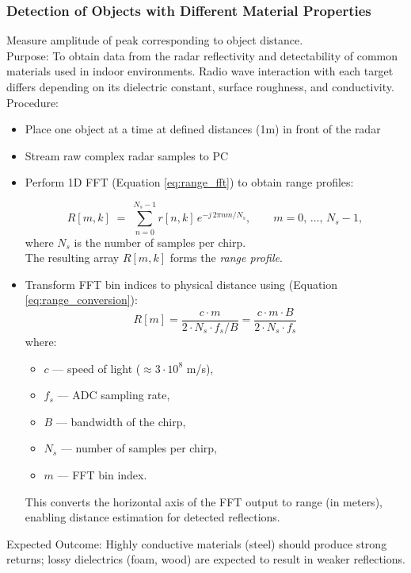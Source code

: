 \subsubsection{Detection of Objects with Different Material Properties} 
\noindent
Measure amplitude of peak corresponding to object distance. 
\\
Purpose:
To obtain data from the radar reflectivity and detectability of common materials used in indoor environments. Radio wave interaction with each target differs depending on its dielectric constant, surface roughness, and conductivity.
Procedure:
\begin{itemize}
\item     Place one object at a time at defined distances (1m) in front of the radar
\item     Stream raw complex radar samples to PC
\item     Perform 1D FFT (Equation \ref{eq:range_fft}) to obtain range profiles:

\begin{equation}
    R[m,k] \;=\;
        \sum_{n=0}^{N_s-1} r[n,k]\,
        e^{-j\,2\pi n m / N_s},
    \qquad
    m = 0,\,\dots,\,N_s-1,
    \label{eq:range_fft}
\end{equation}
where $N_s$ is the number of samples per chirp.  \\
The resulting array $R[m,k]$ forms the \emph{range profile}.
\item Transform FFT bin indices to physical distance using (Equation \ref{eq:range_conversion}):
    \begin{equation}
        R[m] = \frac{c \cdot m}{2 \cdot N_s \cdot f_s / B}
        = \frac{c \cdot m \cdot B}{2 \cdot N_s \cdot f_s}
        \label{eq:range_conversion}
    \end{equation}
    where:
    \begin{itemize}
        \item $c$ — speed of light ($\approx 3 \cdot 10^8$ m/s),
        \item $f_s$ — ADC sampling rate,
        \item $B$ — bandwidth of the chirp,
        \item $N_s$ — number of samples per chirp,
        \item $m$ — FFT bin index.
    \end{itemize}
    This converts the horizontal axis of the FFT output to range (in meters), enabling distance estimation for detected reflections.

\end{itemize}
\noindent
Expected Outcome:
Highly conductive materials (steel) should produce strong returns; lossy dielectrics (foam, wood) are expected to result in weaker reflections.

